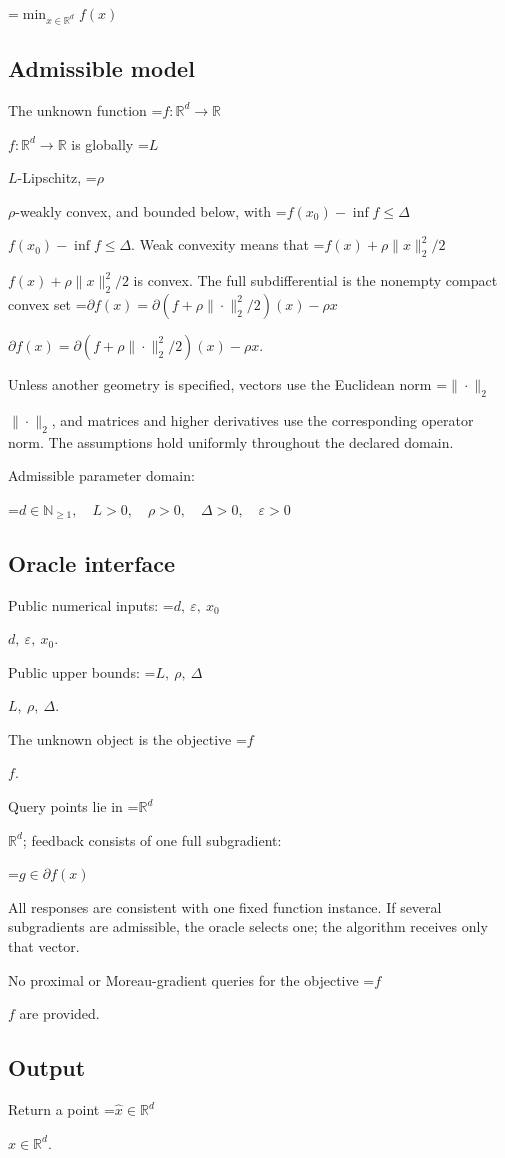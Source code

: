 \documentclass[10pt,a4paper]{article}
\newcommand{\AtlasMath}[1]{\par\begingroup\centering\setbox0=\hbox{$\displaystyle #1$}\ifdim\wd0>1.4\linewidth\typeout{ATLAS WIDE FORMULA: \the\wd0}\fi\ifdim\wd0>\linewidth\resizebox{\linewidth}{!}{\box0}\else\box0\fi\par\endgroup}
\newcommand{\AtlasInlineMath}[1]{\begingroup\setbox0=\hbox{$#1$}\ifdim\wd0>.4\linewidth\endgroup\AtlasMath{#1}\else\endgroup$#1$\fi}
\begin{document}
\AtlasMath{\min_{x\in \mathbb{R}^d}f(x)}


\subsection{Admissible model}
The unknown function \AtlasInlineMath{f:\mathbb R^d\to\mathbb R} is globally \AtlasInlineMath{L}-Lipschitz, \AtlasInlineMath{\rho}-weakly convex, and bounded below, with \AtlasInlineMath{f(x_0)-\inf f\le\Delta}. Weak convexity means that \AtlasInlineMath{f(x)+\rho\|x\|_2^2/2} is convex. The full subdifferential is the nonempty compact convex set \AtlasInlineMath{\partial f(x)=\partial(f+\rho\|\cdot\|_2^2/2)(x)-\rho x}.

Unless another geometry is specified, vectors use the Euclidean norm \AtlasInlineMath{\|\cdot\|_2}, and matrices and higher derivatives use the corresponding operator norm. The assumptions hold uniformly throughout the declared domain.

Admissible parameter domain:


\AtlasMath{d\in\mathbb{N}_{\ge1},\quad L>0,\quad \rho>0,\quad \Delta>0,\quad \varepsilon>0}


\subsection{Oracle interface}
Public numerical inputs: \AtlasInlineMath{d,\ \varepsilon,\ x_0}.

Public upper bounds: \AtlasInlineMath{L,\ \rho,\ \Delta}.

The unknown object is the objective \AtlasInlineMath{f}.

Query points lie in \AtlasInlineMath{\mathbb{R}^d}; feedback consists of one full subgradient:


\AtlasMath{g\in\partial f(x)}


All responses are consistent with one fixed function instance. If several subgradients are admissible, the oracle selects one; the algorithm receives only that vector.

No proximal or Moreau-gradient queries for the objective \AtlasInlineMath{f} are provided.

\subsection{Output}
Return a point \AtlasInlineMath{\widehat x\in\mathbb R^d}.
\end{document}
